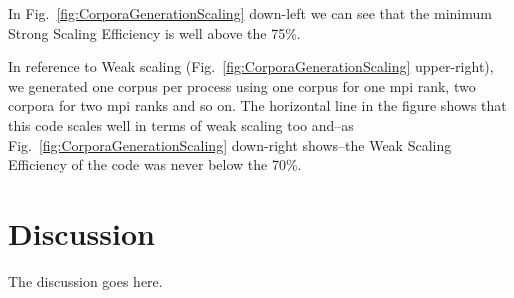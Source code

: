 \documentclass[10pt,journal,compsoc]{IEEEtran}
\begin{document}
In Fig.~\ref{fig:CorporaGenerationScaling} down-left we can see that the minimum Strong Scaling Efficiency is well above the 75\%.  

In reference to Weak scaling (Fig.~\ref{fig:CorporaGenerationScaling} upper-right), we generated one corpus per process using one corpus for one \gls{mpi} rank, two corpora for two \gls{mpi} ranks and so on. The horizontal line in the figure shows that this code scales well  in terms of weak scaling too and--as Fig.~\ref{fig:CorporaGenerationScaling} down-right shows--the Weak Scaling Efficiency of the code was never below the 70\%.










\section{Discussion}
The discussion goes here.















%
%

\end{document}
